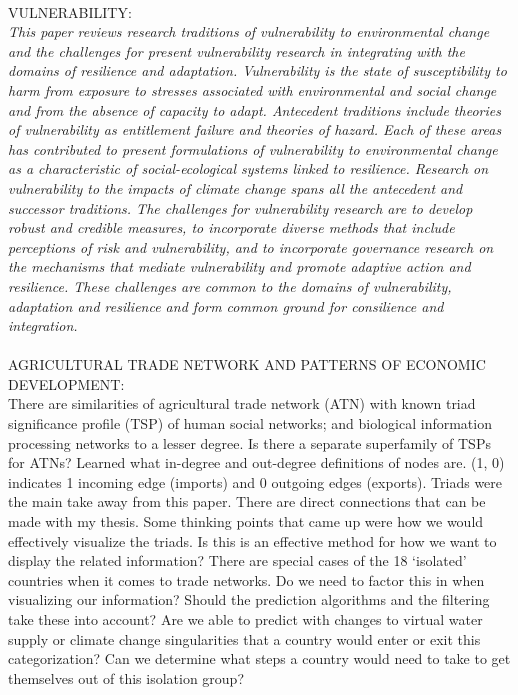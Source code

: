 \\
VULNERABILITY: ~\cite{adger2006vulnerability}\\
\textit{This paper reviews research traditions of vulnerability to environmental change and the challenges for present vulnerability research in integrating with the domains of resilience and adaptation. Vulnerability is the state of susceptibility to harm from exposure to stresses associated with environmental and social change and from the absence of capacity to adapt. Antecedent traditions include theories of vulnerability as entitlement failure and theories of hazard. Each of these areas has contributed to present formulations of vulnerability to environmental change as a characteristic of social-ecological systems linked to resilience. Research on vulnerability to the impacts of climate change spans all the antecedent and successor traditions. The challenges for vulnerability research are to develop robust and credible measures, to incorporate diverse methods that include perceptions of risk and vulnerability, and to incorporate governance research on the mechanisms that mediate vulnerability and promote adaptive action and resilience. These challenges are common to the domains of vulnerability, adaptation and resilience and form common ground for consilience and integration.}\\
\\
AGRICULTURAL TRADE NETWORK AND PATTERNS OF ECONOMIC DEVELOPMENT: ~\cite{shutters2012agricultural}\\
There are similarities of agricultural trade network (ATN) with known triad significance profile (TSP) of human social networks; and biological information processing networks to a lesser degree.  Is there a separate superfamily of TSPs for ATNs? Learned what in-degree and out-degree definitions of nodes are. (1, 0) indicates 1 incoming edge (imports) and 0 outgoing edges (exports).
Triads were the main take away from this paper. There are direct connections that can be made with my thesis. Some thinking points that came up were how we would effectively visualize the triads. Is this is an effective method for how we want to display the related information? 
There are special cases of the 18 ‘isolated’ countries when it comes to trade networks. Do we need to factor this in when visualizing our information?  Should the prediction algorithms and the filtering take these into account? Are we able to predict with changes to virtual water supply or climate change singularities that a country would enter or exit this categorization? Can we determine what steps a country would need to take to get themselves out of this isolation group?
